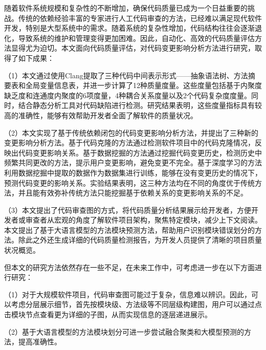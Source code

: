 \begin{conclusions}

随着软件系统规模和复杂性的不断增加，确保代码质量已成为一个日益重要的挑战。传统的依赖经验丰富的专家进行人工代码审查的方法，已经难以满足现代软件开发，特别是大型系统中的需求。随着系统的复杂性增加，代码结构往往会逐渐退化，导致系统的维护和管理变得更加困难。因此，自动化、高效的代码质量评估方法显得尤为迫切。本文面向代码质量评估，对代码变更影响分析方法进行研究，取得了如下成果：

（1）本文通过使用Clang提取了三种代码中间表示形式——抽象语法树、方法摘要表和全局变量信息表，并进一步计算了12种质量度量。这些度量包括基于内聚度缺乏度和连通度内聚度的6项度量，4种耦合关系度量以及2个代码复杂度度量。同时，结合静态分析工具对代码缺陷进行检测。研究结果表明，这些度量指标具有较高的准确性，能够有效帮助开发者全面了解软件的质量状况。

（2）本文实现了基于传统依赖闭包的代码变更影响分析方法，并提出了三种新的变更影响分析方法。基于代码克隆的方法通过检测软件项目中的代码克隆情况，反映出代码变更影响关系。基于数据挖掘的方法通过挖掘代码变更历史，检测历史中频繁共同更改的方法，提示用户变更影响，避免变更不完全。基于深度学习的方法利用数据挖掘中提取的数据作为数据集进行训练，能够在没有变更历史的情况下，预测代码变更的影响关系。实验结果表明，这三种方法均在不同的角度优于传统方法，并且能有效弥补传统方法只能挖掘基于依赖关系的变更影响关系的不足。

（3）本文提出了代码审查图的方式，将代码质量分析结果展示给开发者，方便开发者或审查者从宏观的角度了解软件项目架构，聚焦特定模块，减少上下文阅读。本文提出了基于大语言模型的方法模块预测方法，帮助用户识别模块错误划分的方法。除此之外还生成详细的代码质量检测报告，为开发人员提供了清晰的项目质量状况概览。

但本文的研究方法依然存在一些不足，在未来工作中，可考虑进一步在以下方面进行研究：

（1）对于大规模软件项目，代码审查图可能过于复杂，信息难以辨识。因此，可以考虑分层展示细节，首先按模块级、方法级等不同层级构建图，用户可以通过点击模块节点查看更为详细的子图，从而实现信息的逐层递进展示。

（2）基于大语言模型的方法模块划分可进一步尝试融合聚类和大模型预测的方法，提高准确性。

\end{conclusions}
